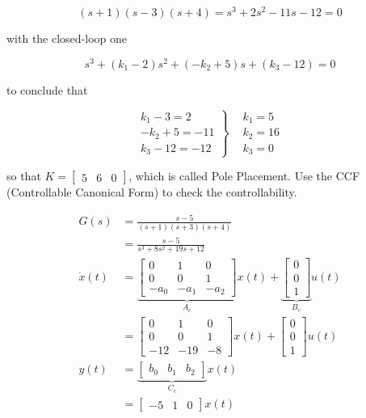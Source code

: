 \documentclass[main.tex]{subfiles}
\begin{document}
\begin{enumerate}
\begin{enumerate}
    $$
    (s+1)(s-3)(s+4)= s^3 + 2s^2 - 11s - 12 = 0
    $$
    
    with the closed-loop one
    
    $$
    s^3 + (k_1-2)s^2 + (-k_2 + 5)s + (k_3 - 12) = 0
    $$
    
    to conclude that
    
    $$
    \left.\begin{array}{c}
    k_1-3 = 2 \\
    -k_2 + 5 = -11 \\
    k_3 - 12 = -12
    \end{array}\right\} \begin{aligned}
    & k_1 = 5 \\
    & k_2 = 16 \\
    & k_3 = 0
    \end{aligned}
    $$
    
    so that $K=\left[\begin{array}{lll}5 & 6 & 0\end{array}\right]$, which is called Pole Placement. Use the CCF (Controllable Canonical Form) to check the controllability. 
    
    $$
    \begin{aligned}
    G(s) &= \frac{s-5}{(s+1)(s+3)(s+4)}\\
    &= \frac{s-5}{s^3+8 s^2+19 s+12}\\
    \dot{x}(t) & =\underbrace{\left[\begin{array}{ccc}
    0 & 1 & 0 \\
    0 & 0 & 1 \\
    -a_0 & -a_1 & -a_2
    \end{array}\right]}_{A_c}x(t)+\underbrace{\left[\begin{array}{l}
    0 \\
    0 \\
    1
    \end{array}\right]}_{B_c} u(t) \\
    & =\left[\begin{array}{ccc}
    0 & 1 & 0 \\
    0 & 0 & 1 \\
    -12 & -19 & -8
    \end{array}\right]x(t)+\left[\begin{array}{l}
    0 \\
    0 \\
    1
    \end{array}\right] u(t) \\
    y(t) & =\underbrace{\left[\begin{array}{lll}
    b_0 & b_1 & b_2
    \end{array}\right]}_{C_c}x(t)\\
    & =\left[\begin{array}{lll}
    -5 & 1 & 0
    \end{array}\right]x(t)
    \end{aligned}
    $$
    

\end{enumerate}
\end{enumerate}
\end{document}
